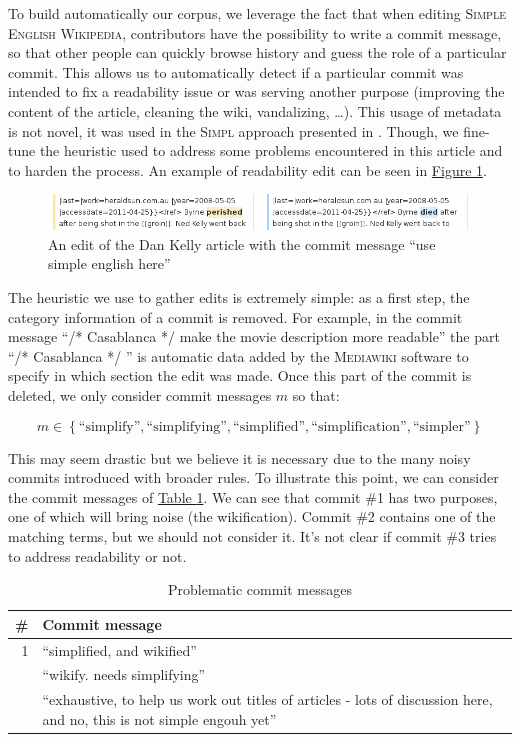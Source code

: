 \documentclass[a4paper, 11pt, onepage]{scrreprt}
\newcommand\sew{\textsc{Simple English Wikipedia}}
\newcommand\tableref[1]{\hyperref[#1]{Table \ref*{#1}}}
\newcommand\figureref[1]{\hyperref[#1]{Figure \ref*{#1}}}
\begin{document}
To build automatically our corpus, we leverage the fact that when
editing \sew, contributors have the possibility to write a commit
message, so that other people can quickly browse history and guess the
role of a particular commit. This allows us to automatically detect if
a particular commit was intended to fix a readability issue or was
serving another purpose (improving the content of the article,
cleaning the wiki, vandalizing, …). This usage of metadata is not
novel, it was used in the \textsc{Simpl} approach presented in
\cite{yatskar2010sake}. Though, we fine-tune the heuristic used to
address some problems encountered in this article and to harden the
process. An example of readability edit can be seen in
\figureref{fig:dan-kelly}.

\begin{figure}[H]
  \centering
  \includegraphics[width=\textwidth]{dan-kelly}
  \caption{An edit of the Dan Kelly article with the commit message
    “use simple english here”}
  \label{fig:dan-kelly}
\end{figure}

The heuristic we use to gather edits is extremely simple: as a first
step, the category information of a commit is removed. For example, in
the commit message “/* Casablanca */ make the movie description more
readable” the part “/* Casablanca */ ” is automatic data added by the
\textsc{Mediawiki} software to specify in which section the edit was
made. Once this part of the commit is deleted, we only consider commit
messages $m$ so that:

\[
m \in \left\{\text{“simplify”}, \text{“simplifying”},
  \text{“simplified”}, \text{“simplification”},
  \text{“simpler”}\right\}
\]

This may seem drastic but we believe it is necessary due to the many
noisy commits introduced with broader rules. To illustrate this point,
we can consider the commit messages of
\tableref{tab:problematic-commits}. We can see that commit \#1 has two
purposes, one of which will bring noise (the wikification). Commit \#2
contains one of the matching terms, but we should not consider
it. It's not clear if commit \#3 tries to address readability or not.

\begin{table}[h]
  \centering
  \caption{Problematic commit messages}
  \begin{tabular}{rp{12cm}}
    \toprule
    \# & Commit message \\
    \midrule
    1 & “simplified, and wikified” \\
    \addlinespace
    2 & “wikify. needs simplifying” \\
    \addlinespace
    3 & “exhaustive, to help us work out titles of articles - lots of
    discussion here, and no, this is not simple engouh yet” \\
  \end{tabular}
  \label{tab:problematic-commits}
\end{table}
\end{document}
